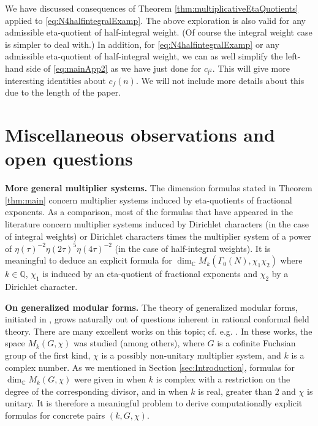 \documentclass[12pt]{amsart}
\numberwithin{equation}{section}
\theoremstyle{plain}
\theoremstyle{definition}
\theoremstyle{remark}
\newcommand\numQ{\mathbb{Q}}
\newcommand\numC{\mathbb{C}}
\begin{document}
We have discussed consequences of Theorem \ref{thm:multiplicativeEtaQuotients} applied to \eqref{eq:N4halfintegralExamp}. The above exploration is also valid for any admissible eta-quotient of half-integral weight. (Of course the integral weight case is simpler to deal with.) In addition, for \eqref{eq:N4halfintegralExamp} or any admissible eta-quotient of half-integral weight, we can as well simplify the left-hand side of \eqref{eq:mainApp2} as we have just done for $c_{l^2}$. This will give more interesting identities about $c_f(n)$. We will not include more details about this due to the length of the paper.


\section{Miscellaneous observations and open questions}
\label{sec:Miscellaneous observations and open questions}
\textbf{More general multiplier systems.} The dimension formulas stated in Theorem \ref{thm:main} concern multiplier systems induced by eta-quotients of fractional exponents. As a comparison, most of the formulas that have appeared in the literature concern multiplier systems induced by Dirichlet characters (in the case of integral weights) or Dirichlet characters times the multiplier system of a power of $\eta(\tau)^{-2}\eta(2\tau)^5\eta(4\tau)^{-2}$ (in the case of half-integral weights). It is meaningful to deduce an explicit formula for $\dim_\numC M_k(\Gamma_0(N),\chi_1\chi_2)$ where $k\in\numQ$, $\chi_1$ is induced by an eta-quotient of fractional exponents and $\chi_2$ by a Dirichlet character.


\textbf{On generalized modular forms.} The theory of generalized modular forms, initiated in \cite{KM03}, grows naturally out of questions inherent in rational conformal field theory. There are many excellent works on this topic; cf. e.g. \cite{KM09,Koh10,KR10,Raj13,BCD18}. In these works, the space $M_k(G,\chi)$ was studied (among others), where $G$ is a cofinite Fuchsian group of the first kind, $\chi$ is a possibly non-unitary multiplier system, and $k$ is a complex number. As we mentioned in Section \ref{sec:Introduction}, formulas for $\dim_\numC M_k(G,\chi)$ were given in \cite[p. 194]{Pet38} when $k$ is complex with a restriction on the degree of the corresponding divisor, and in \cite[Theorem 2.5.4]{Fis87} when $k$ is real, greater than $2$ and $\chi$ is unitary. It is therefore a meaningful problem to derive computationally explicit formulas for concrete pairs $(k,G,\chi)$.
\end{document}
